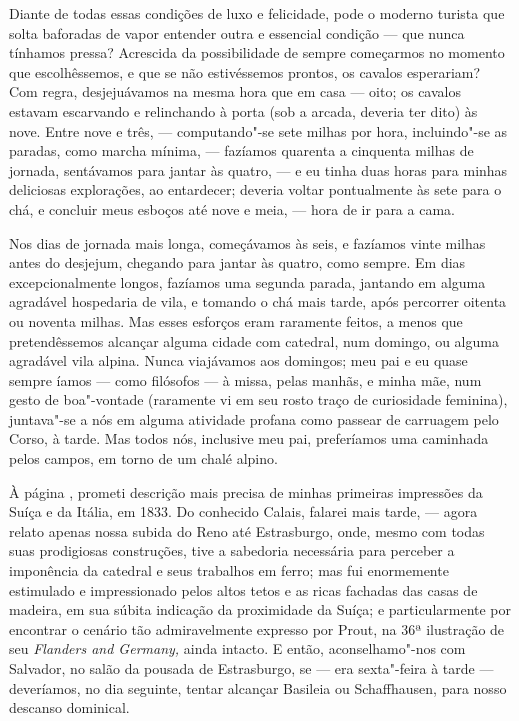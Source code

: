 Diante de todas essas condições de luxo e felicidade, pode o
moderno turista que solta baforadas de vapor entender outra e essencial
condição --- que nunca tínhamos pressa? Acrescida da possibilidade de
sempre começarmos no momento que escolhêssemos, e que se não
estivéssemos prontos, os cavalos esperariam? Com regra, desjejuávamos na
mesma hora que em casa --- oito; os cavalos estavam escarvando e
relinchando à porta (sob a arcada, deveria ter dito) às nove. Entre nove
e três, --- computando"-se sete milhas por hora, incluindo"-se as paradas,
como marcha mínima, --- fazíamos quarenta a cinquenta milhas de jornada,
sentávamos para jantar às quatro, --- e eu tinha duas horas para minhas
deliciosas explorações, ao entardecer; deveria voltar pontualmente às
sete para o chá, e concluir meus esboços até nove e meia, --- hora de ir
para a cama.

Nos dias de jornada mais longa, começávamos às seis, e fazíamos vinte
milhas antes do desjejum, chegando para jantar às quatro, como sempre.
Em dias excepcionalmente longos, fazíamos uma segunda parada, jantando
em alguma agradável hospedaria de vila, e tomando o chá mais tarde, após
percorrer oitenta ou noventa milhas. Mas esses esforços eram raramente
feitos, a menos que pretendêssemos alcançar alguma cidade com catedral,
num domingo, ou alguma agradável vila alpina. Nunca viajávamos aos
domingos; meu pai e eu quase sempre íamos --- como filósofos --- à missa,
pelas manhãs, e minha mãe, num gesto de boa"-vontade (raramente vi em seu
rosto traço de curiosidade feminina), juntava"-se a nós em alguma
atividade profana como passear de carruagem pelo Corso, à tarde. Mas
todos nós, inclusive meu pai, preferíamos uma caminhada pelos campos, em
torno de um chalé alpino.

À página \pageref{suica},
prometi descrição mais precisa de minhas primeiras impressões da Suíça e
da Itália, em 1833. Do conhecido Calais, falarei mais tarde, --- agora
relato apenas nossa subida do Reno até Estrasburgo, onde, mesmo com
todas suas prodigiosas construções, tive a sabedoria necessária para
perceber a imponência da catedral e seus trabalhos em ferro; mas fui
enormemente estimulado e impressionado pelos altos tetos e as ricas
fachadas das casas de madeira, em sua súbita indicação da proximidade da
Suíça; e particularmente por encontrar o cenário tão admiravelmente
expresso por Prout, na 36ª ilustração de seu \textit{Flanders and
Germany,} ainda intacto. E então, aconselhamo"-nos com Salvador, no salão
da pousada de Estrasburgo, se --- era sexta"-feira à tarde --- deveríamos,
no dia seguinte, tentar alcançar Basileia ou Schaffhausen, para nosso
descanso dominical.

